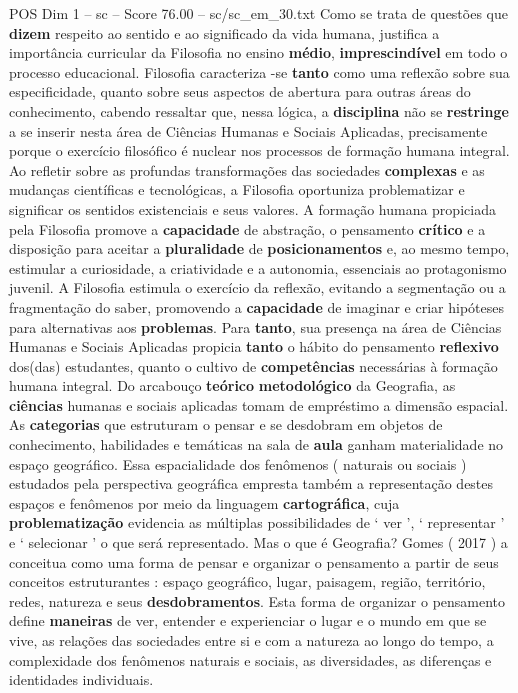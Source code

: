 \begin{textsample}{POS Dim 1 – sc – Score 76.00 – sc/sc\_em\_30.txt}
Como se trata de questões que \textbf{dizem} respeito ao sentido e ao significado da vida humana, justifica a importância curricular da Filosofia no ensino \textbf{médio}, \textbf{imprescindível} em todo o processo educacional.
Filosofia caracteriza -se \textbf{tanto} como uma reflexão sobre sua especificidade, quanto sobre seus aspectos de abertura para outras áreas do conhecimento, cabendo ressaltar que, nessa lógica, a \textbf{disciplina} não se \textbf{restringe} a se inserir nesta área de Ciências Humanas e Sociais Aplicadas, precisamente porque o exercício filosófico é nuclear nos processos de formação humana integral.
Ao refletir sobre as profundas transformações das sociedades \textbf{complexas} e as mudanças científicas e tecnológicas, a Filosofia oportuniza problematizar e significar os sentidos existenciais e seus valores.
A formação humana propiciada pela Filosofia promove a \textbf{capacidade} de abstração, o pensamento \textbf{crítico} e a disposição para aceitar a \textbf{pluralidade} de \textbf{posicionamentos} e, ao mesmo tempo, estimular a curiosidade, a criatividade e a autonomia, essenciais ao protagonismo juvenil.
A Filosofia estimula o exercício da reflexão, evitando a segmentação ou a fragmentação do saber, promovendo a \textbf{capacidade} de imaginar e criar hipóteses para alternativas aos \textbf{problemas}.
Para \textbf{tanto}, sua presença na área de Ciências Humanas e Sociais Aplicadas propicia \textbf{tanto} o hábito do pensamento \textbf{reflexivo} dos(das) estudantes, quanto o cultivo de \textbf{competências} necessárias à formação humana integral.
Do arcabouço \textbf{teórico} \textbf{metodológico} da Geografia, as \textbf{ciências} humanas e sociais aplicadas tomam de empréstimo a dimensão espacial.
As \textbf{categorias} que estruturam o pensar e se desdobram em objetos de conhecimento, habilidades e temáticas na sala de \textbf{aula} ganham materialidade no espaço geográfico.
Essa espacialidade dos fenômenos ( naturais ou sociais ) estudados pela perspectiva geográfica empresta também a representação destes espaços e fenômenos por meio da linguagem \textbf{cartográfica}, cuja \textbf{problematização} evidencia as múltiplas possibilidades de ‘ ver ’, ‘ representar ’ e ‘ selecionar ’ o que será representado.
Mas o que é Geografia?
Gomes ( 2017 ) a conceitua como uma forma de pensar e organizar o pensamento a partir de seus conceitos estruturantes : espaço geográfico, lugar, paisagem, região, território, redes, natureza e seus \textbf{desdobramentos}.
Esta forma de organizar o pensamento define \textbf{maneiras} de ver, entender e experienciar o lugar e o mundo em que se vive, as relações das sociedades entre si e com a natureza ao longo do tempo, a complexidade dos fenômenos naturais e sociais, as diversidades, as diferenças e identidades individuais.

\end{textsample}
